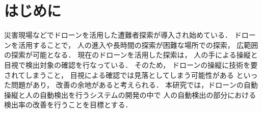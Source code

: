 \documentclass[uplatex]{jsarticle}
\begin{document}
 
    \section{はじめに}
    災害現場などでドローンを活用した遭難者探索が導入され始めている．
    ドローンを活用することで，
    人の進入や長時間の探索が困難な場所での探索，
    広範囲の探索が可能となる．
    現在のドローンを活用した探索は，
    人の手による操縦と目視で検出対象の確認を行なっている．
    そのため，
    ドローンの操縦に技術を要されてしまうこと，
    目視による確認では見落としてしまう可能性がある
    といった問題があり，
    改善の余地があると考えられる．
    本研究では，ドローンの自動操縦と人の自動検出を行うシステムの開発の中で
    人の自動検出の部分における検出率の改善を行うことを目標とする．
\end{document}
